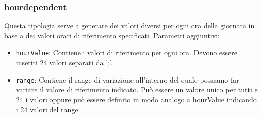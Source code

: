 \documentclass[12pt,a4paper,italian]{article}
\begin{document}
\subsubsection{hourdependent} Questa tipologia serve a generare dei valori diversi per ogni ora della giornata in base a dei valori orari di riferimento specificati.
Parametri aggiuntivi:
\begin{itemize}
	\item \texttt{hourValue}: Contiene i valori di riferimento per ogni ora. Devono essere inseriti 24 valori separati da ';'. 
	\item \texttt{range}: Contiene il range di variazione all'interno del quale possiamo far variare il valore di riferimento indicato. Può essere un
	valore unico per tutti e 24 i valori oppure può essere definito in modo analogo a hourValue indicando i 24 valori del range.
\end{itemize}
\end{document}
